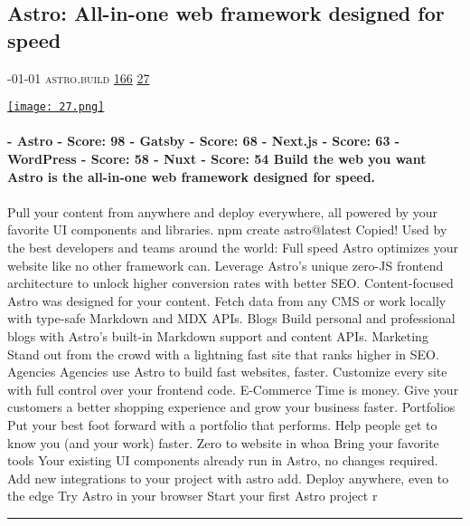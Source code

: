 \documentclass[10pt,a4paper]{article}
\begin{document}
\begin{multicols*}{2}
\begin{minipage}{\linewidth}
\subsection{Astro: All-in-one web framework designed for speed}
\textsc{\footnotesize
{\scriptsize\faCalendar}-01-01 
{\scriptsize\faGlobe}\space 
astro.build 
{\scriptsize\faThumbsOUp}\space 
\href{http://news.ycombinator.com/item?id=37108111\&utm\_term=comment}{166} 
{\scriptsize\faComments}\space 
\href{http://news.ycombinator.com/item?id=37108111\&utm\_term=comment}{27} 
}
\par\medskip\noindent
\href{https://astro.build/?utm\_source=hackernewsletter\&utm\_medium=email\&utm\_term=code}{
    \texttt{[image: 27.png]}
}
\end{minipage}
\paragraph{}
\textbf{- Astro
-
Score: 98
- Gatsby
-
Score: 68
- Next.js
-
Score: 63
- WordPress
-
Score: 58
- Nuxt
-
Score: 54
Build the web
you want
Astro is the all-in-one web framework designed for speed.}
\paragraph{}
 Pull your content from anywhere and deploy everywhere, all powered by your favorite UI components and libraries.
npm create astro@latest
Copied!
Used by the best developers and teams around the world:
Full speed
Astro optimizes your website like no other framework can. Leverage Astro's unique zero-JS frontend architecture to unlock higher conversion rates with better SEO.
Content-focused
Astro was designed for your content. Fetch data from any CMS or work locally with type-safe Markdown and MDX APIs.
Blogs
Build personal and professional blogs with Astro's built-in Markdown support and content APIs.
Marketing
Stand out from the crowd with a lightning fast site that ranks higher in SEO.
Agencies
Agencies use Astro to build fast websites, faster. Customize every site with full control over your frontend code.
E-Commerce
Time is money. Give your customers a better shopping experience and grow your business faster.
Portfolios
Put your best foot forward with a portfolio that performs. Help people get to know you (and your work) faster.
Zero to website in whoa
Bring your
favorite tools
Your existing UI components already run in Astro, no changes required. Add new
integrations to your project with
astro add.
Deploy anywhere, even to the edge
Try Astro in your browser
Start your first Astro project r
\par\noindent\textcolor{red}{\rule{\linewidth}{0.2mm}}
\vfill
\null
\noindent\begin{minipage}{\linewidth}

\end{minipage}
\end{multicols*}
\end{document}
